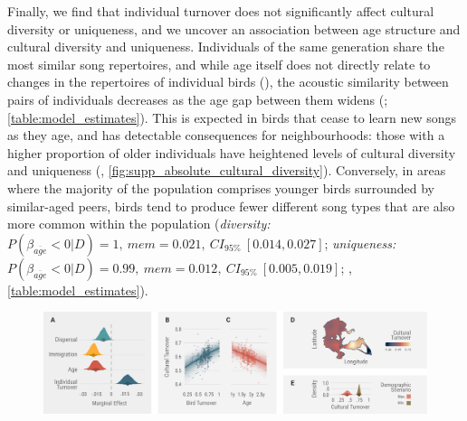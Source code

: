 \documentclass[9pt, onecolumn, twoside, lineno]{gsajnl}
\begin{document}
Finally, we find that individual turnover does not significantly affect cultural diversity or uniqueness, and we uncover an association between age structure and cultural diversity and uniqueness. Individuals of the same generation share the most similar song repertoires, and while age itself does not directly relate to changes in the repertoires of individual birds (), the acoustic similarity between pairs of individuals decreases as the age gap between them widens (; \autoref{table:model_estimates}). This is expected in birds that cease to learn new songs as they age, and has detectable consequences for neighbourhoods: those with a higher proportion of older individuals have heightened levels of cultural diversity and uniqueness (, \autoref{fig:supp_absolute_cultural_diversity}). Conversely, in areas where the majority of the population comprises younger birds surrounded by similar-aged peers, birds tend to produce fewer different song types that are also more common within the population (\textit{diversity:} $P(\beta_{\overline{age}} < 0 | D) = 1,~mem=0.021,~CI_{95\%}~[0.014, 0.027]$; \textit{uniqueness:} $P(\beta_{\overline{age}} < 0 | D) = 0.99,~mem=0.012,~CI_{95\%}~[0.005, 0.019]$; , \autoref{table:model_estimates}).

\begin{figure}[!htb]
    \centering
    \includegraphics[width=\linewidth]{figures/chapter_4/FIG4.pdf}
    \label{c4_fig:turnover}
\end{figure}
\end{document}
